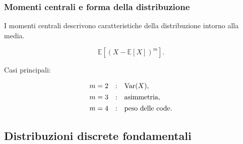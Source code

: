 \documentclass[handout]{beamer}%
\providecommand{\E}{\mathbb{E}}
\providecommand{\1}{\mathbf{1}}
\providecommand{\Var}{\operatorname{Var}}
\providecommand{\QTR}[2]{\csname #1\endcsname{#2}}
\begin{document}
\begin{frame}%
%

\frametitle{Momenti centrali e forma della distribuzione}%


I momenti centrali descrivono caratteristiche della distribuzione intorno alla media.%

\[
\E[(X-\E[X])^m].
\]


\medskip

Casi principali:%

\[%
\begin{array}
[c]{rcl}%
m=2 & : & \Var(X),\\[4pt]%
m=3 & : & \mbox{asimmetria},\\[4pt]%
m=4 & : & \mbox{peso delle code}.
\end{array}
\]
%

\transboxout
\end{frame}%




\subsection{Distribuzioni discrete fondamentali}%
\end{document}
